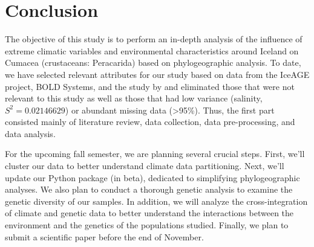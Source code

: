 \section{Conclusion}\label{conclusion}

The objective of this study is to perform an in-depth analysis of the influence of extreme climatic variables and environmental characteristics around Iceland on Cumacea (crustaceans: Peracarida) based on phylogeographic analysis. To date, we have selected relevant attributes for our study based on data from the IceAGE project, BOLD Systems, and the study by \cite{uhlir2021adding} and eliminated those that were not relevant to this study as well as those that had low variance (salinity, \( S^2 = 0.02146629 \)) or abundant missing data (>95\%). Thus, the first part consisted mainly of literature review, data collection, data pre-processing, and data analysis.

For the upcoming fall semester, we are planning several crucial steps. First, we'll cluster our data to better understand climate data partitioning. Next, we'll update our Python package (in beta), dedicated to simplifying phylogeographic analyses. We also plan to conduct a thorough genetic analysis to examine the genetic diversity of our samples. In addition, we will analyze the cross-integration of climate and genetic data to better understand the interactions between the environment and the genetics of the populations studied. Finally, we plan to submit a scientific paper before the end of November.